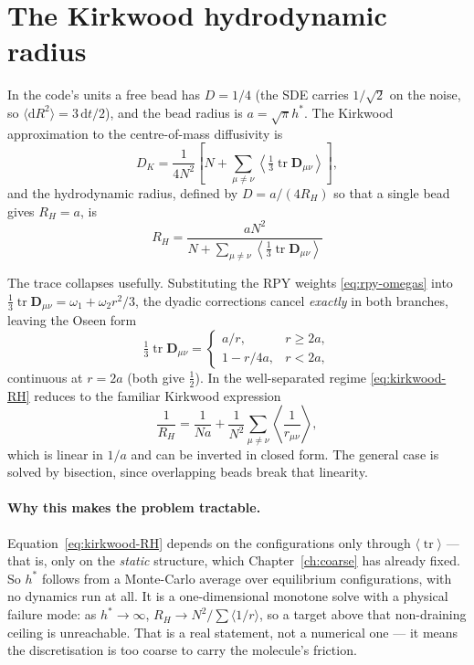 \documentclass[11pt,a4paper]{report}
\begin{document}
\section{The Kirkwood hydrodynamic radius}

In the code's units a free bead has $D = 1/4$ (the SDE carries $1/\sqrt2$ on the
noise, so $\langle\mathrm{d}R^2\rangle = 3\,\mathrm{d}t/2$), and the bead radius is
$a = \sqrt{\pi}h^{*}$. The Kirkwood approximation to the centre-of-mass
diffusivity is
\begin{equation}
  D_K = \frac{1}{4N^{2}}\left[N + \sum_{\mu\neq\nu}
        \left\langle \tfrac13\operatorname{tr}\bm{D}_{\mu\nu}\right\rangle\right],
  \label{eq:kirkwood-D}
\end{equation}
and the hydrodynamic radius, defined by $D = a/(4R_H)$ so that a single bead gives
$R_H = a$, is
\begin{equation}
  \boxed{\;
  R_H = \frac{a N^{2}}
             {N + \sum_{\mu\neq\nu}\left\langle\tfrac13\operatorname{tr}\bm{D}_{\mu\nu}\right\rangle}\;}
  \label{eq:kirkwood-RH}
\end{equation}

The trace collapses usefully. Substituting the RPY weights \eqref{eq:rpy-omegas}
into $\tfrac13\operatorname{tr}\bm{D}_{\mu\nu} = \omega_1 + \omega_2 r^{2}/3$, the
dyadic corrections cancel \emph{exactly} in both branches, leaving the Oseen form
\begin{equation}
  \tfrac13\operatorname{tr}\bm{D}_{\mu\nu} =
  \begin{cases}
    a/r, & r \ge 2a,\\[2pt]
    1 - r/4a, & r < 2a,
  \end{cases}
  \label{eq:rpy-trace}
\end{equation}
continuous at $r = 2a$ (both give $\tfrac12$). In the well-separated regime
\eqref{eq:kirkwood-RH} reduces to the familiar Kirkwood expression
\begin{equation}
  \frac{1}{R_H} = \frac{1}{Na} + \frac{1}{N^{2}}\sum_{\mu\neq\nu}
                  \left\langle\frac{1}{r_{\mu\nu}}\right\rangle,
  \label{eq:kirkwood-classic}
\end{equation}
which is linear in $1/a$ and can be inverted in closed form. The general case is
solved by bisection, since overlapping beads break that linearity.

\paragraph{Why this makes the problem tractable.} Equation~\eqref{eq:kirkwood-RH}
depends on the configurations only through $\langle\operatorname{tr}\rangle$ ---
that is, only on the \emph{static} structure, which Chapter~\ref{ch:coarse} has
already fixed. So $h^{*}$ follows from a Monte-Carlo average over equilibrium
configurations, with no dynamics run at all. It is a one-dimensional monotone
solve with a physical failure mode: as $h^{*}\to\infty$,
$R_H \to N^{2}/\sum\langle 1/r\rangle$, so a target above that non-draining
ceiling is unreachable. That is a real statement, not a numerical one --- it means
the discretisation is too coarse to carry the molecule's friction.
\end{document}
